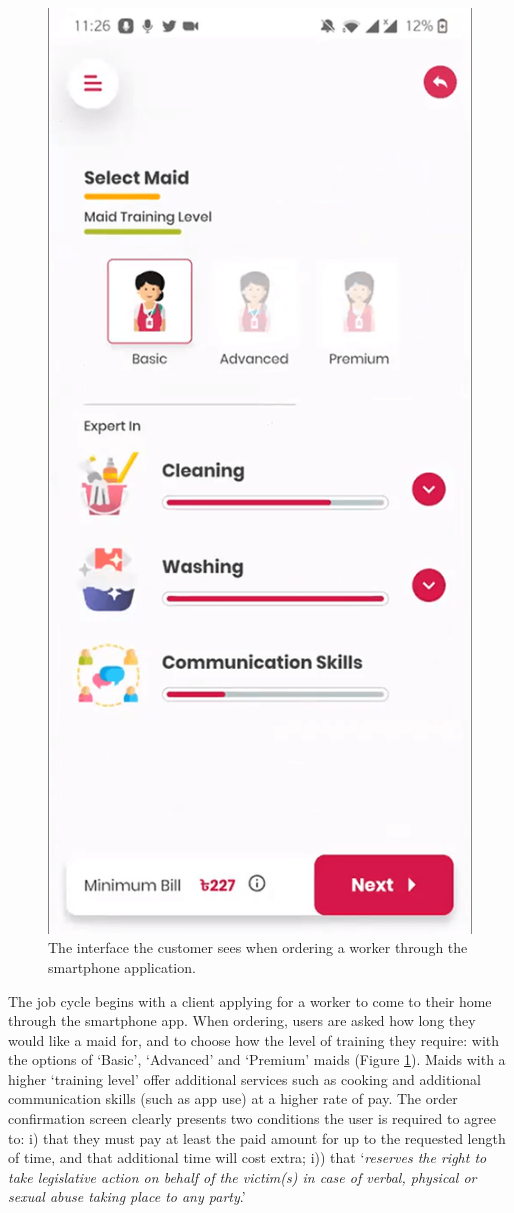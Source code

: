 \begin{figure}[h]
  \centering
  \includegraphics[width=0.65\linewidth]{images/orderingaworker.png}
  \caption{The interface the customer sees when ordering a worker through the \PC{} smartphone application.}\label{fig:Ordering}
\end{figure}

The job cycle begins with a client applying for a worker to come to their home through the \PC{} smartphone app. When ordering, users are asked how long they would like a maid for, and to choose how the level of training they require: with the options of `Basic', `Advanced' and `Premium' maids (Figure \ref{fig:Ordering}). Maids with a higher `training level' offer additional services such as cooking and additional communication skills (such as app use) at a higher rate of pay. The order confirmation screen clearly presents two conditions the user is required to agree to: i) that they must pay at least the paid amount for up to the requested length of time, and that additional time will cost extra; i)) that \PC{} `\textit{reserves the right to take legislative action on behalf of the victim(s) in case of verbal, physical or sexual abuse taking place to any party}.' 

